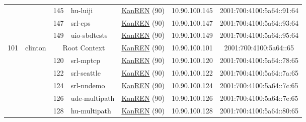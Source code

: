 \begin{small}
\begin{center}
\begin{longtable}{|c|c|c|c|c|c|c|c|}
  &  & \tiny{145} & \multicolumn{1}{|l|}{\tiny{hu-luiji}} & \multicolumn{2}{|c|}{\tiny{\href{http://www.kanren.net}{KanREN} (90)}} & \tiny{10.90.100.145} & \tiny{2001:700:4100:5a64::91:64} \\* \cline{3-3}\cline{4-4}\cline{5-5}\cline{6-6}\cline{7-7}\cline{8-8}
  &  & \tiny{147} & \multicolumn{1}{|l|}{\tiny{srl-cps}} & \multicolumn{2}{|c|}{\tiny{\href{http://www.kanren.net}{KanREN} (90)}} & \tiny{10.90.100.147} & \tiny{2001:700:4100:5a64::93:64} \\* \cline{3-3}\cline{4-4}\cline{5-5}\cline{6-6}\cline{7-7}\cline{8-8}
  &  & \tiny{149} & \multicolumn{1}{|l|}{\tiny{uio-sbdtests}} & \multicolumn{2}{|c|}{\tiny{\href{http://www.kanren.net}{KanREN} (90)}} & \tiny{10.90.100.149} & \tiny{2001:700:4100:5a64::95:64} \\ \hline
 \multirow{16}{*}{\tiny{101}} & \multicolumn{1}{|l|}{\multirow{16}{*}{\tiny{clinton}}} & \multicolumn{2}{|c|}{\tiny{Root Context}} & \multicolumn{2}{|c|}{\tiny{\href{http://www.kanren.net}{KanREN} (90)}} & \tiny{10.90.100.101} & \tiny{2001:700:4100:5a64::65} \\* \cline{3-3}\cline{4-4}\cline{5-5}\cline{6-6}\cline{7-7}\cline{8-8}
  &  & \tiny{120} & \multicolumn{1}{|l|}{\tiny{srl-mptcp}} & \multicolumn{2}{|c|}{\tiny{\href{http://www.kanren.net}{KanREN} (90)}} & \tiny{10.90.100.120} & \tiny{2001:700:4100:5a64::78:65} \\* \cline{3-3}\cline{4-4}\cline{5-5}\cline{6-6}\cline{7-7}\cline{8-8}
  &  & \tiny{122} & \multicolumn{1}{|l|}{\tiny{srl-seattle}} & \multicolumn{2}{|c|}{\tiny{\href{http://www.kanren.net}{KanREN} (90)}} & \tiny{10.90.100.122} & \tiny{2001:700:4100:5a64::7a:65} \\* \cline{3-3}\cline{4-4}\cline{5-5}\cline{6-6}\cline{7-7}\cline{8-8}
  &  & \tiny{124} & \multicolumn{1}{|l|}{\tiny{srl-nndemo}} & \multicolumn{2}{|c|}{\tiny{\href{http://www.kanren.net}{KanREN} (90)}} & \tiny{10.90.100.124} & \tiny{2001:700:4100:5a64::7c:65} \\* \cline{3-3}\cline{4-4}\cline{5-5}\cline{6-6}\cline{7-7}\cline{8-8}
  &  & \tiny{126} & \multicolumn{1}{|l|}{\tiny{ude-multipath}} & \multicolumn{2}{|c|}{\tiny{\href{http://www.kanren.net}{KanREN} (90)}} & \tiny{10.90.100.126} & \tiny{2001:700:4100:5a64::7e:65} \\* \cline{3-3}\cline{4-4}\cline{5-5}\cline{6-6}\cline{7-7}\cline{8-8}
  &  & \tiny{128} & \multicolumn{1}{|l|}{\tiny{hu-multipath}} & \multicolumn{2}{|c|}{\tiny{\href{http://www.kanren.net}{KanREN} (90)}} & \tiny{10.90.100.128} & \tiny{2001:700:4100:5a64::80:65} \\* \cline{3-3}\cline{4-4}\cline{5-5}\cline{6-6}\cline{7-7}\cline{8-8}

\end{longtable}
\end{center}
\end{small}

